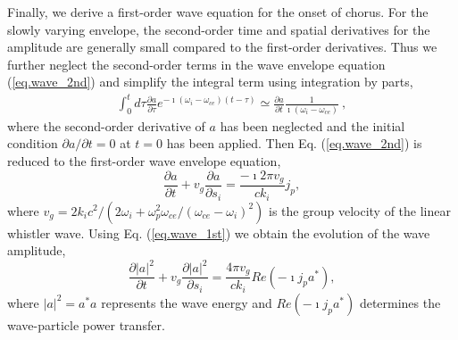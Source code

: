 Finally, we  derive a first-order wave equation for the onset of chorus. 
For the slowly varying envelope, the second-order time and spatial derivatives for the amplitude are generally small compared to the first-order derivatives. 
Thus we further neglect the second-order terms in the wave envelope equation
(\ref{eq.wave_2nd})
and simplify 
the integral term %
using integration by parts,
\begin{equation}
\begin{aligned}
\int_0^{t} d \tau \frac{\partial a}{\partial \tau} e^{-\imath\left(\omega_{i}-\omega_{c e}\right)(t-\tau)}
    \simeq \frac{\partial a}{\partial t}\frac{1}{\imath\left(\omega_{i}-\omega_{ce}\right)}~,
\end{aligned}
\end{equation}
where the second-order  derivative of $a$ has been neglected
and  the initial condition  $\partial a/\partial t = 0$ at $t=0$ has been applied.
Then Eq. (\ref{eq.wave_2nd}) is reduced to the first-order wave envelope equation,
\begin{equation}\label{eq.wave_1st}
    \frac{\partial a}{\partial t} +v_g \frac{\partial a}{\partial s_i} =\frac{-\imath 2\pi v_g}{c k_i } j_p,
\end{equation}
where  $v_g = 2 k_i c^2 / (2\omega_i + \omega_p^2 \omega_{ce}/(\omega_{ce}-\omega_i)^2) $  is the group velocity of the linear whistler wave.
Using Eq. (\ref{eq.wave_1st}) we obtain the evolution of the wave amplitude,
\begin{equation}
    \frac{\partial |a|^2}{\partial t} +v_g \frac{\partial |a|^2}{\partial s_i} =\frac{ 4\pi v_g}{  ck_i} Re( -\imath j_p a^*),
\end{equation}
where $|a|^2=a^* a$ represents the wave energy and $Re( -\imath j_p a^*)$ determines the wave-particle power transfer. 


